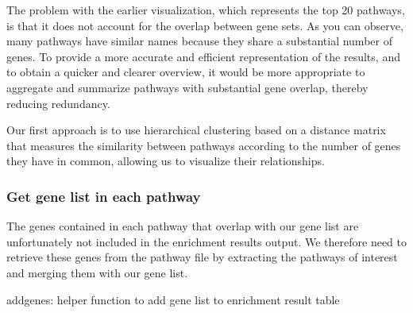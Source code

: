 \documentclass[
]{book}
\newenvironment{Shaded}{\begin{snugshade}}{\end{snugshade}}
\newcommand{\AttributeTok}[1]{\textcolor[rgb]{0.13,0.29,0.53}{#1}}
\newcommand{\CommentTok}[1]{\textcolor[rgb]{0.56,0.35,0.01}{\textit{#1}}}
\newcommand{\DecValTok}[1]{\textcolor[rgb]{0.00,0.00,0.81}{#1}}
\newcommand{\FunctionTok}[1]{\textcolor[rgb]{0.13,0.29,0.53}{\textbf{#1}}}
\newcommand{\NormalTok}[1]{#1}
\newcommand{\OtherTok}[1]{\textcolor[rgb]{0.56,0.35,0.01}{#1}}
\newcommand{\SpecialCharTok}[1]{\textcolor[rgb]{0.81,0.36,0.00}{\textbf{#1}}}
\begin{document}
The problem with the earlier visualization, which represents the top 20 pathways, is that it does not account for the overlap between gene sets. As you can observe, many pathways have similar names because they share a substantial number of genes. To provide a more accurate and efficient representation of the results, and to obtain a quicker and clearer overview, it would be more appropriate to aggregate and summarize pathways with substantial gene overlap, thereby reducing redundancy.

Our first approach is to use hierarchical clustering based on a distance matrix that measures the similarity between pathways according to the number of genes they have in common, allowing us to visualize their relationships.

\begin{Shaded}
\end{Shaded}

\subsubsection{Get gene list in each pathway}\label{get-gene-list-in-each-pathway}

The genes contained in each pathway that overlap with our gene list are unfortunately not included in the enrichment results output. We therefore need to retrieve these genes from the pathway file by extracting the pathways of interest and merging them with our gene list.

addgenes: helper function to add gene list to enrichment result table
\end{document}

